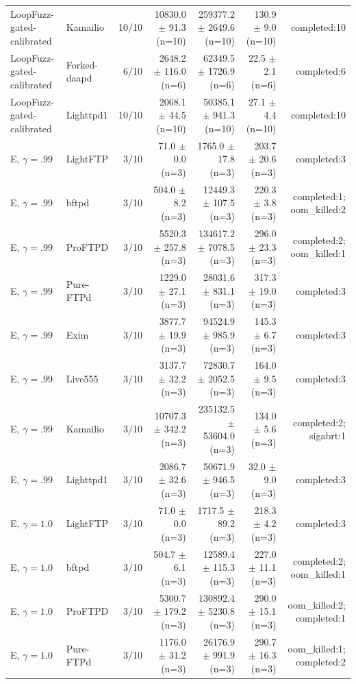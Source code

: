 \begin{table}[t]
{\begin{tabular}{llrrrrr}
LoopFuzz-gated-calibrated & Kamailio & 10/10 & 10830.0 $\pm$ 91.3 (n=10) & 259377.2 $\pm$ 2649.6 (n=10) & 130.9 $\pm$ 9.0 (n=10) & completed:10 \\
LoopFuzz-gated-calibrated & Forked-daapd & 6/10 & 2648.2 $\pm$ 116.0 (n=6) & 62349.5 $\pm$ 1726.9 (n=6) & 22.5 $\pm$ 2.1 (n=6) & completed:6 \\
LoopFuzz-gated-calibrated & Lighttpd1 & 10/10 & 2068.1 $\pm$ 44.5 (n=10) & 50385.1 $\pm$ 941.3 (n=10) & 27.1 $\pm$ 4.4 (n=10) & completed:10 \\
E, $\gamma=.99$ & LightFTP & 3/10 & 71.0 $\pm$ 0.0 (n=3) & 1765.0 $\pm$ 17.8 (n=3) & 203.7 $\pm$ 20.6 (n=3) & completed:3 \\
E, $\gamma=.99$ & bftpd & 3/10 & 504.0 $\pm$ 8.2 (n=3) & 12449.3 $\pm$ 107.5 (n=3) & 220.3 $\pm$ 3.8 (n=3) & completed:1; oom\_killed:2 \\
E, $\gamma=.99$ & ProFTPD & 3/10 & 5520.3 $\pm$ 257.8 (n=3) & 134617.2 $\pm$ 7078.5 (n=3) & 296.0 $\pm$ 23.3 (n=3) & completed:2; oom\_killed:1 \\
E, $\gamma=.99$ & Pure-FTPd & 3/10 & 1229.0 $\pm$ 27.1 (n=3) & 28031.6 $\pm$ 831.1 (n=3) & 317.3 $\pm$ 19.0 (n=3) & completed:3 \\
E, $\gamma=.99$ & Exim & 3/10 & 3877.7 $\pm$ 19.9 (n=3) & 94524.9 $\pm$ 985.9 (n=3) & 145.3 $\pm$ 6.7 (n=3) & completed:3 \\
E, $\gamma=.99$ & Live555 & 3/10 & 3137.7 $\pm$ 32.2 (n=3) & 72830.7 $\pm$ 2052.5 (n=3) & 164.0 $\pm$ 9.5 (n=3) & completed:3 \\
E, $\gamma=.99$ & Kamailio & 3/10 & 10707.3 $\pm$ 342.2 (n=3) & 235132.5 $\pm$ 53604.0 (n=3) & 134.0 $\pm$ 5.6 (n=3) & completed:2; sigabrt:1 \\
E, $\gamma=.99$ & Lighttpd1 & 3/10 & 2086.7 $\pm$ 32.6 (n=3) & 50671.9 $\pm$ 946.5 (n=3) & 32.0 $\pm$ 9.0 (n=3) & completed:3 \\
E, $\gamma=1.0$ & LightFTP & 3/10 & 71.0 $\pm$ 0.0 (n=3) & 1717.5 $\pm$ 89.2 (n=3) & 218.3 $\pm$ 4.2 (n=3) & completed:3 \\
E, $\gamma=1.0$ & bftpd & 3/10 & 504.7 $\pm$ 6.1 (n=3) & 12589.4 $\pm$ 115.3 (n=3) & 227.0 $\pm$ 11.1 (n=3) & completed:2; oom\_killed:1 \\
E, $\gamma=1.0$ & ProFTPD & 3/10 & 5300.7 $\pm$ 179.2 (n=3) & 130892.4 $\pm$ 5230.8 (n=3) & 290.0 $\pm$ 15.1 (n=3) & oom\_killed:2; completed:1 \\
E, $\gamma=1.0$ & Pure-FTPd & 3/10 & 1176.0 $\pm$ 31.2 (n=3) & 26176.9 $\pm$ 991.9 (n=3) & 290.7 $\pm$ 16.3 (n=3) & oom\_killed:1; completed:2 \\

\end{tabular}}
\end{table}
